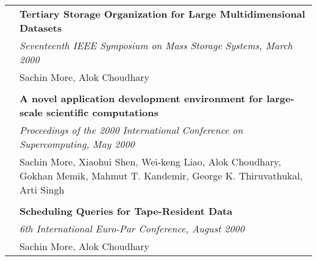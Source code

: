 \documentclass[10pt]{article}
\begin{document}
\begin{longtable}{p{ 90pt}p{299pt}r}
\\
                    & \multicolumn{2}{p{4.5in}}{\bf Tertiary Storage Organization for Large Multidimensional Datasets}\\
                    & \multicolumn{2}{p{4.5in}}{\em Seventeenth IEEE Symposium on Mass Storage Systems, March 2000}\\
                    & \multicolumn{2}{p{4.5in}}{Sachin More, Alok Choudhary}\\
\\
                    & \multicolumn{2}{p{4.5in}}{\bf A novel application development environment for large-scale scientific computations}\\
                    & \multicolumn{2}{p{4.5in}}{\em Proceedings of the 2000 International Conference on Supercomputing, May 2000}\\
                    & \multicolumn{2}{p{4.5in}}{Sachin More, Xiaohui Shen, Wei-keng Liao, Alok Choudhary, Gokhan Memik, Mahmut T. Kandemir, George K. Thiruvathukal, Arti Singh}\\
\\
                    & \multicolumn{2}{p{4.5in}}{\bf Scheduling Queries for Tape-Resident Data}\\
                    & \multicolumn{2}{p{4.5in}}{\em 6th International Euro-Par Conference, August 2000}\\
                    & \multicolumn{2}{p{4.5in}}{Sachin More, Alok Choudhary}\\
\end{longtable}
\end{document}
